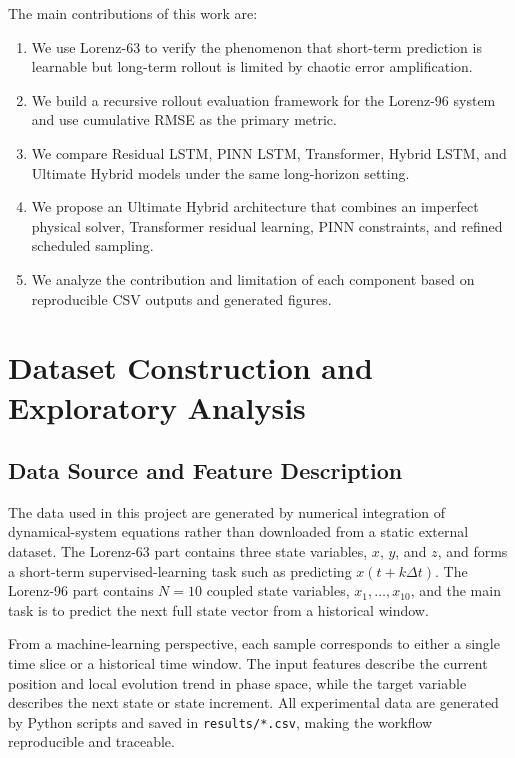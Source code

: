 \documentclass[a4paper,12pt]{article}
\newcommand{\dt}{\Delta t}
\begin{document}
The main contributions of this work are:
\begin{enumerate}
    \item We use Lorenz-63 to verify the phenomenon that short-term prediction is learnable but long-term rollout is limited by chaotic error amplification.
    \item We build a recursive rollout evaluation framework for the Lorenz-96 system and use cumulative RMSE as the primary metric.
    \item We compare Residual LSTM, PINN LSTM, Transformer, Hybrid LSTM, and Ultimate Hybrid models under the same long-horizon setting.
    \item We propose an Ultimate Hybrid architecture that combines an imperfect physical solver, Transformer residual learning, PINN constraints, and refined scheduled sampling.
    \item We analyze the contribution and limitation of each component based on reproducible CSV outputs and generated figures.
\end{enumerate}

\section{Dataset Construction and Exploratory Analysis}

\subsection{Data Source and Feature Description}

The data used in this project are generated by numerical integration of dynamical-system equations rather than downloaded from a static external dataset. The Lorenz-63 part contains three state variables, $x$, $y$, and $z$, and forms a short-term supervised-learning task such as predicting $x(t+k\dt)$. The Lorenz-96 part contains $N=10$ coupled state variables, $x_1,\dots,x_{10}$, and the main task is to predict the next full state vector from a historical window.

From a machine-learning perspective, each sample corresponds to either a single time slice or a historical time window. The input features describe the current position and local evolution trend in phase space, while the target variable describes the next state or state increment. All experimental data are generated by Python scripts and saved in \texttt{results/*.csv}, making the workflow reproducible and traceable.
\end{document}
